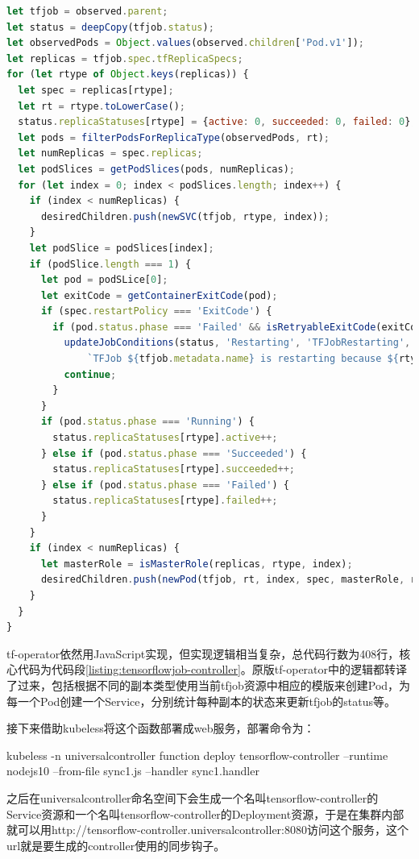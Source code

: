 \documentclass[macfonts,master]{njuthesis}
\begin{document}
\begin{lstlisting}[language=JavaScript,caption=tensorflowjob-controller的实现代码,label=listing:tensorflowjob-controller]
let tfjob = observed.parent;
let status = deepCopy(tfjob.status);
let observedPods = Object.values(observed.children['Pod.v1']);
let replicas = tfjob.spec.tfReplicaSpecs;
for (let rtype of Object.keys(replicas)) {
  let spec = replicas[rtype];
  let rt = rtype.toLowerCase();
  status.replicaStatuses[rtype] = {active: 0, succeeded: 0, failed: 0};
  let pods = filterPodsForReplicaType(observedPods, rt);
  let numReplicas = spec.replicas;
  let podSlices = getPodSlices(pods, numReplicas);
  for (let index = 0; index < podSlices.length; index++) {
    if (index < numReplicas) {
      desiredChildren.push(newSVC(tfjob, rtype, index));
    }
    let podSlice = podSlices[index];
    if (podSlice.length === 1) {
      let pod = podSLice[0];
      let exitCode = getContainerExitCode(pod);
      if (spec.restartPolicy === 'ExitCode') {
        if (pod.status.phase === 'Failed' && isRetryableExitCode(exitCode)) {
          updateJobConditions(status, 'Restarting', 'TFJobRestarting',
              `TFJob ${tfjob.metadata.name} is restarting because ${rtype} replica(s) failed.`);
          continue;
        }
      }
      if (pod.status.phase === 'Running') {
        status.replicaStatuses[rtype].active++;
      } else if (pod.status.phase === 'Succeeded') {
        status.replicaStatuses[rtype].succeeded++;
      } else if (pod.status.phase === 'Failed') {
        status.replicaStatuses[rtype].failed++;
      }
    }
    if (index < numReplicas) {
      let masterRole = isMasterRole(replicas, rtype, index);
      desiredChildren.push(newPod(tfjob, rt, index, spec, masterRole, replicas));
    }
  }
}
\end{lstlisting}

tf-operator依然用JavaScript实现，但实现逻辑相当复杂，总代码行数为408行，核心代码为代码段\ref{listing:tensorflowjob-controller}。原版tf-operator中的逻辑都转译了过来，包括根据不同的副本类型使用当前tfjob资源中相应的模版来创建Pod，为每一个Pod创建一个Service，分别统计每种副本的状态来更新tfjob的status等。

接下来借助kubeless将这个函数部署成web服务，部署命令为：

kubeless -n universalcontroller function deploy tensorflow-controller --runtime nodejs10 --from-file sync1.js --handler sync1.handler

之后在universalcontroller命名空间下会生成一个名叫tensorflow-controller的Service资源和一个名叫tensorflow-controller的Deployment资源，于是在集群内部就可以用http://tensorflow-controller.universalcontroller:8080访问这个服务，这个url就是要生成的controller使用的同步钩子。
\end{document}

